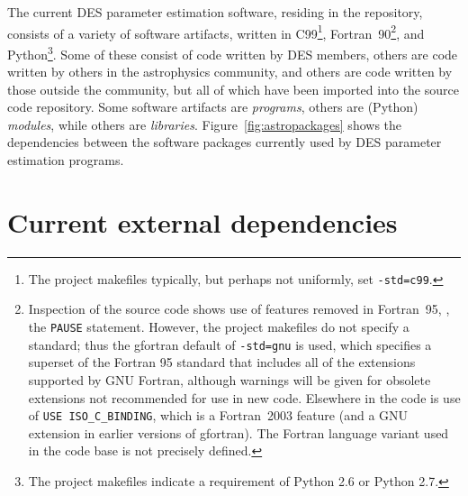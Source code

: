 \documentclass[draftmode,draftwater]{memarticle}
\newcommand{\despipe}{\name{des-pipe}\xspace}
\begin{document}
The current DES parameter estimation software, residing in the
\despipe repository, consists of a variety of software
artifacts, written in C99\footnote{The project makefiles typically, but
  perhaps not uniformly, set \texttt{-std=c99}.},
Fortran~90\footnote{Inspection of the source code shows use of features
  removed in Fortran~95, \eg, the \texttt{PAUSE} statement. However, the
  project makefiles do not specify a standard; thus the gfortran default
  of \texttt{-std=gnu} is used, which specifies a superset of the
  Fortran 95 standard that includes all of the extensions supported by
  GNU Fortran, although warnings will be given for obsolete extensions
  not recommended for use in new code. Elsewhere in the code is use of
  \texttt{USE ISO\_C\_BINDING}, which is a Fortran~2003 feature (and a
  GNU extension in earlier versions of gfortran). The Fortran language
  variant used in the code base is not precisely defined.}, and
Python\footnote{The project makefiles indicate a requirement of Python
  2.6 or Python 2.7.}. Some of these consist of code written by DES
members, others are code written by others in the astrophysics
community, and others are code written by those outside the community,
but all of which have been imported into the \despipe source
code repository. Some software artifacts are \emph{programs}, others are
(Python) \emph{modules}, while others are \emph{libraries}.
Figure~\ref{fig:astropackages} shows the dependencies between the
software packages currently used by DES parameter estimation programs.

\section{Current external dependencies}
\end{document}
